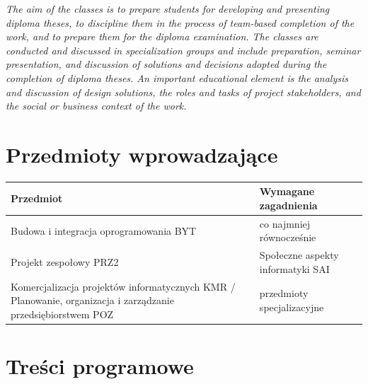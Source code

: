 \documentclass[12pt, a4paper]{article}
\newcommand{\thdrule}{\noalign{\global\setlength{\extrarowheight}{0pt}}}
\newcommand{\thdend}{\noalign{\global\setlength{\extrarowheight}{3pt}}}
\begin{document}
\textit{The aim of the classes is to prepare students for developing and presenting diploma theses, to discipline them in the process of team-based completion of the work, and to prepare them for the diploma examination. The classes are conducted and discussed in specialization groups and include preparation, seminar presentation, and discussion of solutions and decisions adopted during the completion of diploma theses. An important educational element is the analysis and discussion of design solutions, the roles and tasks of project stakeholders, and the social or business context of the work.}


\section{Przedmioty wprowadzające}

{\scriptsize
\begin{tabularx}{\textwidth}{m{5cm}Y}
\thdrule\toprule
{} {\color{white}\textbf{Przedmiot}} & {\color{white}\textbf{Wymagane zagadnienia}} \\
\midrule\thdend
   Budowa i integracja oprogramowania BYT & co najmniej równocześnie \\
   Projekt zespołowy PRZ2 & Społeczne aspekty informatyki SAI \\
   Komercjalizacja projektów informatycznych KMR / Planowanie, organizacja i zarządzanie przedsiębiorstwem POZ & przedmioty specjalizacyjne \\
\bottomrule
\end{tabularx}}

\section{Treści programowe}
\end{document}
